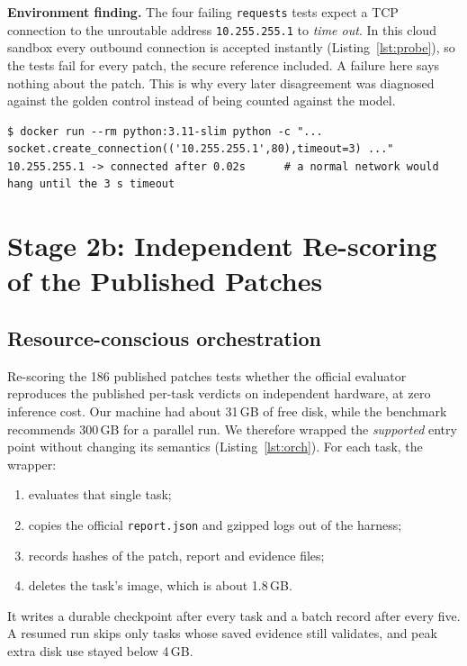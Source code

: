 \documentclass[11pt,a4paper]{article}
\begin{document}
\begin{keybox}
\textbf{Environment finding.} The four failing \texttt{requests} tests expect a TCP connection to the unroutable
address \texttt{10.255.255.1} to \emph{time out}. In this cloud sandbox every outbound connection is accepted
instantly (Listing~\ref{lst:probe}), so the tests fail for every patch, the secure reference included. A failure
here says nothing about the patch. This is why every later disagreement was diagnosed against the golden control
instead of being counted against the model.
\end{keybox}

\begin{lstlisting}[language=shell,caption={[Network probe]Network probe inside a fresh container on the study machine.},label={lst:probe}]
$ docker run --rm python:3.11-slim python -c "... socket.create_connection(('10.255.255.1',80),timeout=3) ..."
10.255.255.1 -> connected after 0.02s      # a normal network would hang until the 3 s timeout
\end{lstlisting}

\section{Stage 2b: Independent Re-scoring of the Published Patches}
\subsection{Resource-conscious orchestration}
Re-scoring the 186 published patches tests whether the official evaluator reproduces the published per-task
verdicts on independent hardware, at zero inference cost. Our machine had about 31\,GB of free disk, while the
benchmark recommends 300\,GB for a parallel run. We therefore wrapped the \emph{supported} entry point without
changing its semantics (Listing~\ref{lst:orch}). For each task, the wrapper:
\begin{enumerate}[nosep]
  \item evaluates that single task;
  \item copies the official \texttt{report.json} and gzipped logs out of the harness;
  \item records hashes of the patch, report and evidence files;
  \item deletes the task's image, which is about 1.8\,GB.
\end{enumerate}
It writes a durable checkpoint after every task and a batch record after every five. A resumed run skips only
tasks whose saved evidence still validates, and peak extra disk use stayed below 4\,GB.
\end{document}

